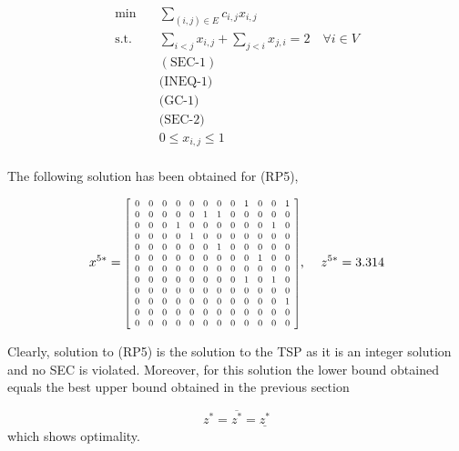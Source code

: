 \documentclass[12pt]{article}
\begin{document}
\begin{equation}
    \begin{aligned}
        \min \quad & \sum_{(i,j)\in E}c_{i,j}x_{i,j}\\
        \textrm{s.t.} \quad & \sum_{i<j}x_{i,j} + \sum_{j<i}x_{j,i} = 2 \quad \forall i \in V\\
        & (\text{SEC-1})   \\
        & \text{(INEQ-1)} \\
        & \text{(GC-1)} \\
        & \text{(SEC-2)} \\
        & 0 \leq x_{i,j}\leq 1    \\
    \end{aligned}
    \tag{RP5}\label{opt-P2}
\end{equation}

The following solution has been obtained for (RP5),

\begin{equation}
    x^{5*} = 
\resizebox{0.4\linewidth}{!}{$
        \left[ \begin {array}{cccccccccccc} 
         0&0&0&0&0&0&0&0&1&0&0&1\\
         0&0&0&0&0&1&1&0&0&0&0&0\\
         0&0&0&1&0&0&0&0&0&0&1&0\\
         0&0&0&0&1&0&0&0&0&0&0&0\\
         0&0&0&0&0&0&1&0&0&0&0&0\\
         0&0&0&0&0&0&0&0&0&1&0&0\\
         0&0&0&0&0&0&0&0&0&0&0&0\\
         0&0&0&0&0&0&0&0&1&0&1&0\\
         0&0&0&0&0&0&0&0&0&0&0&0\\
         0&0&0&0&0&0&0&0&0&0&0&1\\
         0&0&0&0&0&0&0&0&0&0&0&0\\
         0&0&0&0&0&0&0&0&0&0&0&0\\
        \end {array}
        \right]     
$}
\text{, } \quad z^{5*} = 3.314
\end{equation}

Clearly, solution to (RP5) is the solution to the TSP as it is an integer solution and no SEC is violated. Moreover, for this solution the lower bound obtained equals the best upper bound obtained in the previous section

\begin{equation}
    z^{*} = \overline{z^{*}} = \underline{z^{*}}
\end{equation}
which shows optimality.\\
\end{document}
